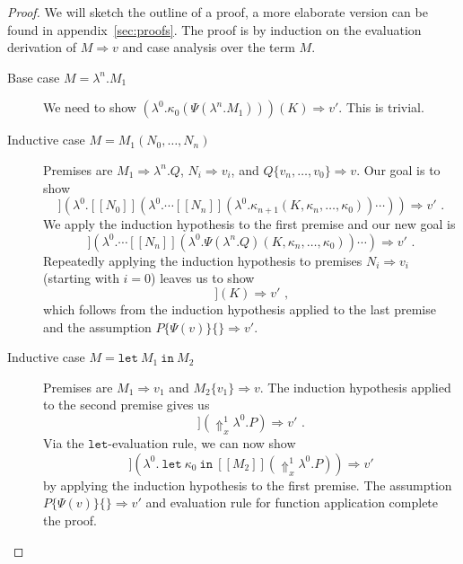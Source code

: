\documentclass[a4paper,11pt,draft]{article}
\newcommand{\kw}[1]{\mathtt{#1}}
\begin{document}
\begin{proof}
We will sketch the outline of a proof, a more elaborate version can be found in
appendix~\ref{sec:proofs}. The proof is by induction on the evaluation derivation
of $M \Rightarrow v$ and case analysis over the term $M$.
\begin{description}
\item[\sffamily Base case $M = \lambda^{n}.M_{1}$]\hfill

  We need to show
  $(\lambda^{0}.\kappa_{0}(\Psi(\lambda^{n}.M_{1}))) (K) \Rightarrow v'$.
  This is trivial.

\item[\sffamily Inductive case $M = M_{1}(N_{0}, \ldots, N_{n})$]\hfill

  Premises are $M_{1} \Rightarrow \lambda^{n}.Q$, $N_{i} \Rightarrow v_{i}$,
  and $Q\{v_{n}, \ldots, v_{0}\} \Rightarrow v$. Our goal is to show
  \begin{equation*}
    [\![M_{1}]\!]
    (\lambda^{0}.[\![N_{0}]\!](\lambda^{0}. \cdots
    [\![N_{n}]\!](\lambda^{0}.\kappa_{n+1}(K, \kappa_{n},
    \ldots, \kappa_{0})) \cdots ))
    \Rightarrow v' \text{ .}
  \end{equation*}
  We apply the induction hypothesis to the first premise and our new goal is
  \begin{equation*}
    [\![N_{0}]\!]
    (\lambda^{0}. \cdots [\![N_{n}]\!](\lambda^{0}.\Psi(\lambda^{n}.Q)
    (K, \kappa_{n}, \ldots, \kappa_{0})) \cdots )
    \Rightarrow v' \text{ .}
  \end{equation*}
  Repeatedly applying the induction hypothesis to premises
  $N_{i} \Rightarrow v_{i}$ (starting with $i=0$) leaves us to show
  \begin{equation*}
    [\![Q\{v_{n}, \ldots, v_{0}\}]\!] (K) \Rightarrow v' \text{ ,}
  \end{equation*}
  which follows from the induction hypothesis applied to the last premise and
  the assumption $P\{\Psi(v)\}\{\} \Rightarrow v'$.

\item[\sffamily Inductive case $M = \kw{let} \: M_{1} \: \kw{in} \: M_{2}$]\hfill

  Premises are $M_{1} \Rightarrow v_{1}$ and $M_{2}\{v_{1}\} \Rightarrow v$. The
  induction hypothesis applied to the second premise gives us
  \begin{equation*}
    [\![M_{2}\{v_{1}\}]\!] (\Uparrow_{x}^{1} \lambda^{0}.P)
    \Rightarrow v' \text{ .}
  \end{equation*}
  Via the $\kw{let}$-evaluation rule, we can now show
  \begin{equation*}
    [\![M_{1}]\!]
    (\lambda^{0}. \: \kw{let} \: \kappa_{0} \: \kw{in} \: [\![M_{2}]\!]
    (\Uparrow_{x}^{1} \lambda^{0}.P)) \Rightarrow v'
  \end{equation*}
  by applying the induction hypothesis to the first premise.
  The assumption $P\{\Psi(v)\}\{\} \Rightarrow v'$ and evaluation rule for
  function application complete the proof.\qedhere
\end{description}
\end{proof}
\end{document}
